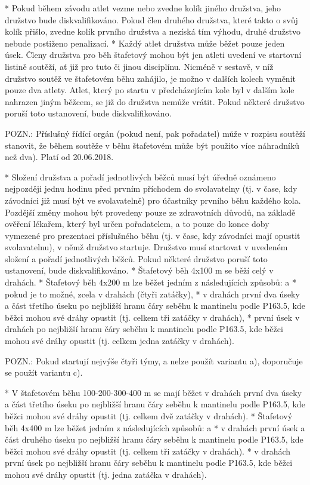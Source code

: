 * Pokud během závodu atlet vezme nebo zvedne kolík jiného družstva, jeho družstvo bude diskvalifikováno. Pokud člen druhého družstva, které takto o svůj kolík přišlo, zvedne kolík prvního družstva a nezíská tím výhodu, druhé družstvo nebude postiženo penalizací.
* Každý atlet družstva může běžet pouze jeden úsek. Členy družstva pro běh štafetový mohou být jen atleti uvedení ve startovní listině soutěží, ať již pro tuto či jinou disciplínu. Nicméně v sestavě, v níž družstvo soutěž ve štafetovém běhu zahájilo, je možno v dalších kolech vyměnit pouze dva atlety. Atlet, který po startu v předcházejícím kole byl v dalším kole nahrazen jiným běžcem, se již do družstva nemůže vrátit. Pokud některé družstvo poruší toto ustanovení, bude diskvalifikováno.

POZN.: Příslušný řídící orgán (pokud není, pak pořadatel) může v rozpisu soutěží stanovit, že během soutěže v běhu štafetovém může být použito více náhradníků než dva). Platí od 20.06.2018.

* Složení družstva a pořadí jednotlivých běžců musí být úředně oznámeno nejpozději jednu hodinu před prvním příchodem do svolavatelny (tj. v čase, kdy závodníci již musí být ve svolavatelně) pro účastníky prvního běhu každého kola. Pozdější změny mohou být provedeny pouze ze zdravotních důvodů, na základě ověření lékařem, který byl určen pořadatelem, a to pouze do konce doby vymezené pro prezentaci příslušného běhu (tj. v čase, kdy závodníci mají opustit svolavatelnu), v němž družstvo startuje. Družstvo musí startovat v uvedeném složení a pořadí jednotlivých běžců. Pokud některé družstvo poruší toto ustanovení, bude diskvalifikováno.
* Štafetový běh 4x100 m se běží celý v drahách.
* Štafetový běh 4x200 m lze běžet jedním z následujících způsobů:
  \begitems \style a
  * pokud je to možné, zcela v drahách (čtyři zatáčky),
  * v drahách první dva úseky a část třetího úseku po nejbližší hranu čáry seběhu k mantinelu podle P163.5, kde běžci mohou své dráhy opustit (tj. celkem tři zatáčky v drahách),
  * první úsek v drahách po nejbližší hranu čáry seběhu k mantinelu podle P163.5, kde běžci mohou své dráhy opustit (tj. celkem jedna zatáčky v drahách).
  \enditems

POZN.: Pokud startují nejvýše čtyři týmy, a nelze použít variantu a), doporučuje se použít variantu c).

* V štafetovém běhu 100-200-300-400 m se mají běžet v drahách první dva úseky a část třetího úseku po nejbližší hranu čáry seběhu k mantinelu podle P163.5, kde běžci mohou své dráhy opustit (tj. celkem dvě zatáčky v drahách).
* Štafetový běh 4x400 m lze běžet jedním z následujících způsobů:
  \begitems \style a
  * v drahách první úsek a část druhého úseku po nejbližší hranu čáry seběhu k mantinelu podle P163.5, kde běžci mohou své dráhy opustit (tj. celkem tři zatáčky v drahách).
  * v drahách první úsek po nejbližší hranu čáry seběhu k mantinelu podle P163.5, kde běžci mohou své dráhy opustit (tj. jedna zatáčka v drahách).
  \enditems

